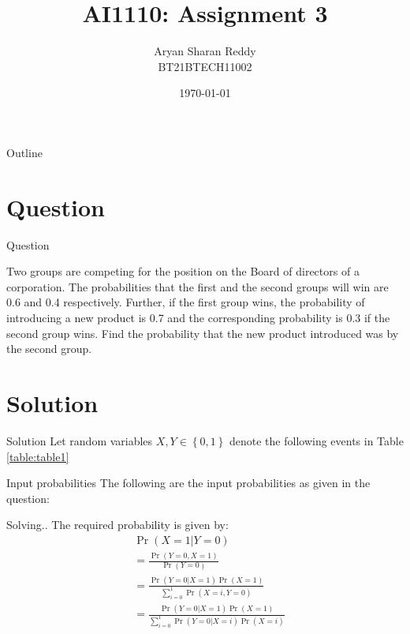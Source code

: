 \documentclass{beamer}
\title{AI1110: Assignment 3}
\author{Aryan Sharan Reddy\\BT21BTECH11002}
\date{\today}
\providecommand{\pr}[1]{\ensuremath{\Pr\left(#1\right)}}
\providecommand{\cbrak}[1]{\ensuremath{\left\{#1\right\}}}
\providecommand{\pr}[1]{\ensuremath{\Pr\left(#1\right)}}
\begin{document}
\begin{frame}
    \titlepage 
\end{frame}



\begin{frame}{Outline}
    \tableofcontents
\end{frame}


\section{Question}
\begin{frame}{Question}

Two groups are competing for the position on the Board of directors of a corporation. The probabilities that the first and the second groups will win are 0.6 and 0.4 respectively. Further, if the first group wins, the probability of introducing a new product is 0.7 and the corresponding probability is 0.3 if the second group wins. Find the probability that the new product introduced was by the second group.

\end{frame}


\section{Solution}
\begin{frame}{Solution}
    Let random variables $X, Y \in \cbrak{0,1}$ denote the following events in Table \eqref{table:table1}
    \begin{table}[ht!]
		\centering
		
		\caption{Description of events}
		\label{table:table1}	
	\end{table}
\end{frame} 

\begin{frame}{Input probabilities}
	The following are the input probabilities as given in the question:
	\begin{table}[ht!]
		\centering
		
		\caption{Input probabilities}
		\label{table:table2}	
	\end{table}
	\end{frame}

\begin{frame}{Solving..}
	The required probability is given by:
	\begin{align}
		&\pr{X = 1|Y = 0} \\ 
		&= \frac{\pr{Y = 0,X = 1}}{\pr{Y = 0}} \\
		&= \frac{\pr{Y = 0|X = 1}\pr{X = 1}}{\sum_{i=0}^1 \pr{X = i,Y = 0}} \\
		&= \frac{\pr{Y = 0|X = 1}\pr{X = 1}}{\sum_{i=0}^1 \pr{Y = 0|X = i}\pr{X = i}}
	\end{align}
	\end{frame}
	
\end{document}
